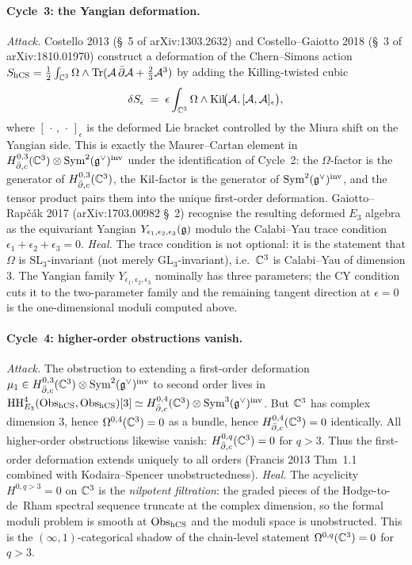\paragraph{Cycle~3: the Yangian deformation.}
\emph{Attack.}  Costello 2013 (\S~5 of arXiv:1303.2632) and
Costello--Gaiotto 2018 (\S~3 of arXiv:1810.01970) construct a
deformation of the Chern--Simons action $S_{\mathrm{hCS}}=\frac{1}{2}\int_{\mathbb{C}^3}
\Omega\wedge\mathrm{Tr}(\mathcal{A}\,\bar\partial\mathcal{A}+\tfrac{2}{3}\mathcal{A}^3)$ by adding the
Killing-twisted cubic
\[
  \delta S_\epsilon
  \;=\;
  \epsilon\int_{\mathbb{C}^3}\Omega\wedge\mathrm{Kil}\!\bigl(\mathcal{A},[\mathcal{A},\mathcal{A}]_\epsilon\bigr),
\]
where $[\,\cdot\,,\,\cdot\,]_\epsilon$ is the deformed Lie bracket
controlled by the Miura shift on the Yangian side.  This is exactly
the Maurer--Cartan element in
$H^{0,3}_{\bar\partial,c}(\mathbb{C}^3)\otimes\mathrm{Sym}^2(\mathfrak{g}^\vee)^{\mathrm{inv}}$ under the
identification of Cycle~2: the $\Omega$-factor is the generator of
$H^{0,3}_{\bar\partial,c}(\mathbb{C}^3)$, the $\mathrm{Kil}$-factor is the generator of
$\mathrm{Sym}^2(\mathfrak{g}^\vee)^{\mathrm{inv}}$, and the tensor product pairs them into the
unique first-order deformation.  Gaiotto--Rap\v{c}\'ak 2017
(arXiv:1703.00982 \S~2) recognise the resulting deformed $E_3$
algebra as the equivariant Yangian $Y_{\epsilon_1,\epsilon_2,
\epsilon_3}(\mathfrak{g})$ modulo the Calabi--Yau trace condition
$\epsilon_1+\epsilon_2+\epsilon_3=0$.
\emph{Heal.}  The trace condition is not optional: it is the
statement that $\Omega$ is $\mathrm{SL}_3$-invariant (not merely
$\mathrm{GL}_3$-invariant), i.e.\ $\mathbb{C}^3$ is Calabi--Yau of dimension
$3$.  The Yangian family $Y_{\epsilon_1,\epsilon_2,\epsilon_3}$
nominally has three parameters; the CY condition cuts it to the
two-parameter family and the remaining tangent direction at
$\epsilon=0$ is the one-dimensional moduli computed above.

\paragraph{Cycle~4: higher-order obstructions vanish.}
\emph{Attack.}  The obstruction to extending a first-order deformation
$\mu_1\in H^{0,3}_{\bar\partial,c}(\mathbb{C}^3)\otimes\mathrm{Sym}^2(\mathfrak{g}^\vee)^{\mathrm{inv}}$ to
second order lives in $\mathrm{HH}^4_{E_3}(\mathrm{Obs}_{\mathrm{hCS}},\mathrm{Obs}_{\mathrm{hCS}})[3]\simeq
H^{0,4}_{\bar\partial,c}(\mathbb{C}^3)\otimes\mathrm{Sym}^3(\mathfrak{g}^\vee)^{\mathrm{inv}}$.  But $\mathbb{C}^3$
has complex dimension $3$, hence $\Omega^{0,4}(\mathbb{C}^3)=0$ as a bundle,
hence $H^{0,4}_{\bar\partial,c}(\mathbb{C}^3)=0$ identically.  All higher-order
obstructions likewise vanish: $H^{0,q}_{\bar\partial,c}(\mathbb{C}^3)=0$ for $q>3$.
Thus the first-order deformation extends uniquely to all orders
(Francis 2013 Thm~1.1 combined with Kodaira--Spencer unobstructedness).
\emph{Heal.}  The acyclicity $H^{0,q>3}=0$ on $\mathbb{C}^3$ is the
\emph{nilpotent filtration}: the graded pieces of the
Hodge-to-de~Rham spectral sequence truncate at the complex dimension,
so the formal moduli problem is smooth at $\mathrm{Obs}_{\mathrm{hCS}}$ and the
moduli space is unobstructed.  This is the $(\infty,1)$-categorical
shadow of the chain-level statement $\Omega^{0,q}(\mathbb{C}^3)=0$ for $q>3$.

